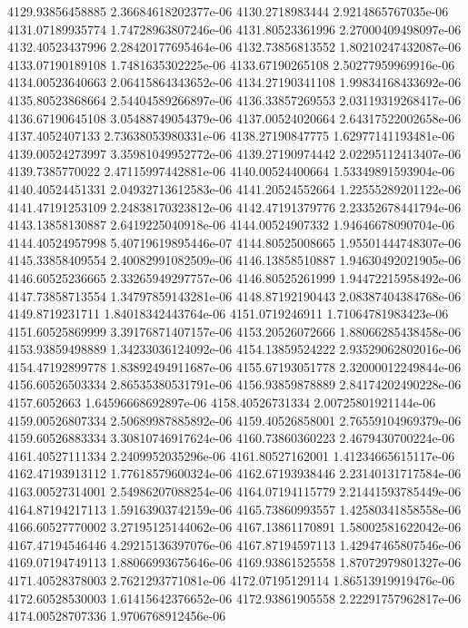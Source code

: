 {4129.93856458885 2.36684618202377e-06
4130.2718983444 2.9214865767035e-06
4131.07189935774 1.74728963807246e-06
4131.80523361996 2.27000409498097e-06
4132.40523437996 2.28420177695464e-06
4132.73856813552 1.80210247432087e-06
4133.07190189108 1.7481635302225e-06
4133.67190265108 2.50277959969916e-06
4134.00523640663 2.06415864343652e-06
4134.27190341108 1.99834168433692e-06
4135.80523868664 2.54404589266897e-06
4136.33857269553 2.03119319268417e-06
4136.67190645108 3.05488749054379e-06
4137.00524020664 2.64317522002658e-06
4137.4052407133 2.73638053980331e-06
4138.27190847775 1.62977141193481e-06
4139.00524273997 3.35981049952772e-06
4139.27190974442 2.02295112413407e-06
4139.7385770022 2.47115997442881e-06
4140.00524400664 1.53349891593904e-06
4140.40524451331 2.04932713612583e-06
4141.20524552664 1.22555289201122e-06
4141.47191253109 2.24838170323812e-06
4142.47191379776 2.23352678441794e-06
4143.13858130887 2.6419225040918e-06
4144.00524907332 1.94646678090704e-06
4144.40524957998 5.40719619895446e-07
4144.80525008665 1.95501444748307e-06
4145.33858409554 2.40082991082509e-06
4146.13858510887 1.94630492021905e-06
4146.60525236665 2.33265949297757e-06
4146.80525261999 1.94472215958492e-06
4147.73858713554 1.34797859143281e-06
4148.87192190443 2.08387404384768e-06
4149.8719231711 1.84018342443764e-06
4151.0719246911 1.71064781983423e-06
4151.60525869999 3.39176871407157e-06
4153.20526072666 1.88066285438458e-06
4153.93859498889 1.34233036124092e-06
4154.13859524222 2.93529062802016e-06
4154.47192899778 1.83892494911687e-06
4155.67193051778 2.32000012249844e-06
4156.60526503334 2.86535380531791e-06
4156.93859878889 2.84174202490228e-06
4157.6052663 1.64596668692897e-06
4158.40526731334 2.00725801921144e-06
4159.00526807334 2.50689987885892e-06
4159.40526858001 2.76559104969379e-06
4159.60526883334 3.30810746917624e-06
4160.73860360223 2.4679430700224e-06
4161.40527111334 2.2409952035296e-06
4161.80527162001 1.41234665615117e-06
4162.47193913112 1.77618579600324e-06
4162.67193938446 2.23140131717584e-06
4163.00527314001 2.54986207088254e-06
4164.07194115779 2.21441593785449e-06
4164.87194217113 1.59163903742159e-06
4165.73860993557 1.42580341858558e-06
4166.60527770002 3.27195125144062e-06
4167.13861170891 1.58002581622042e-06
4167.47194546446 4.29215136397076e-06
4167.87194597113 1.42947465807546e-06
4169.07194749113 1.88066993675646e-06
4169.93861525558 1.87072979801327e-06
4171.40528378003 2.7621293771081e-06
4172.07195129114 1.86513919919476e-06
4172.60528530003 1.61415642376652e-06
4172.93861905558 2.22291757962817e-06
4174.00528707336 1.9706768912456e-06
}
